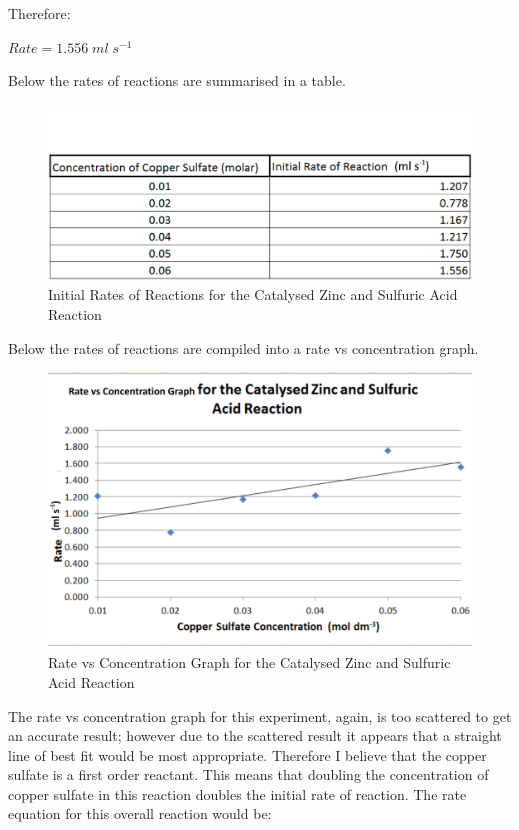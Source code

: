 Therefore:

$Rate = 1.556 \; ml \; s^{-1}$

Below the rates of reactions are summarised in a table.

\begin{figure}[H]
    \includegraphics[width=\textwidth]{./Analysis/Images/3VaryCopperSulfate/Rates.pdf}
    \caption{Initial Rates of Reactions for the Catalysed Zinc and Sulfuric Acid Reaction} \label{fig:RatesSACSVary}
\end{figure}

Below the rates of reactions are compiled into a rate vs concentration graph.

\begin{figure}[H]
    \includegraphics[width=\textwidth]{./Analysis/Images/3VaryCopperSulfate/ProgressGraph.pdf}
    \caption{Rate vs Concentration Graph for the Catalysed Zinc and Sulfuric Acid Reaction} \label{fig:ProgressGraphSACSVary}
\end{figure}

The rate vs concentration graph for this experiment, again,  is too scattered to get an accurate result; however due to the scattered result it appears that a straight line of best fit would be most appropriate. Therefore I believe that the copper sulfate is a first order reactant. This means that doubling the concentration of copper sulfate in this reaction doubles the initial rate of reaction. The rate equation for this overall reaction would be:

